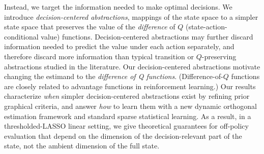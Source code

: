 \documentclass[opre,nonblindrev]{informs4}
\begin{document}
Instead, we target the information needed to make optimal decisions. We introduce \textit{decision-centered abstractions}, mappings of the state space to a simpler state space that preserves the value of the \textit{difference} of $Q$ (state-action-conditional value) functions. Decision-centered abstractions may further discard information needed to predict the value under each action separately, and therefore discard more information than typical transition or $Q$-preserving abstractions studied in the literature. Our decision-centered abstractions motivate changing the estimand to the \textit{difference of Q functions}. (Difference-of-$Q$ functions are closely related to advantage functions in reinforcement learning.) Our results characterize \textit{when} simpler decision-centered abstractions exist by refining prior graphical criteria, and answer \textit{how} to learn them with a new dynamic orthogonal estimation framework and standard sparse statistical learning. As a result, in a thresholded-LASSO linear setting, we give theoretical guarantees for off-policy evaluation that depend on the dimension of the decision-relevant part of the state, not the ambient dimension of the full state.  %

\end{document}
